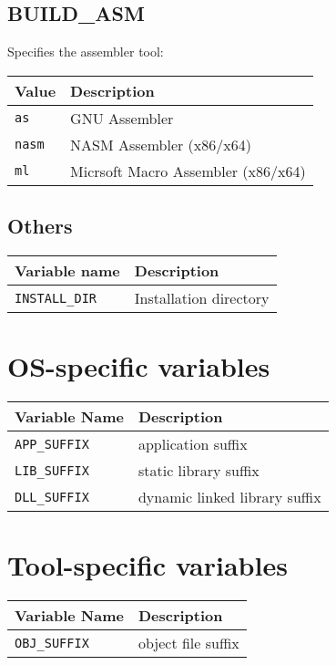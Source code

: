 \documentclass{article}
\newcommand{\var}[1]{{\tt #1}}
\newcommand{\val}[1]{{\tt #1}}
\begin{document}
\subsection{BUILD\_ASM}

Specifies the assembler tool:

\begin{tabular}{ll}
Value      & Description              \\
\hline
\val{as}   & GNU Assembler            \\
\val{nasm} & NASM Assembler (x86/x64) \\
\val{ml}   & Micrsoft Macro Assembler (x86/x64)\\
\end{tabular}

\subsection{Others}

\begin{tabular}{ll}
Variable name		& Description		\\
\hline
\var{INSTALL\_DIR}	& Installation directory \\
\end{tabular}
\section{OS-specific variables}

\begin{tabular}{ll}
Variable Name    & Description                   \\
\hline
\var{APP\_SUFFIX} & application suffix            \\
\var{LIB\_SUFFIX} & static library suffix         \\
\var{DLL\_SUFFIX} & dynamic linked library suffix \\
\end{tabular}

\section{Tool-specific variables}

\begin{tabular}{ll}
Variable Name    & Description                   \\
\hline
\var{OBJ\_SUFFIX} & object file suffix            \\
\end{tabular}
\end{document}
